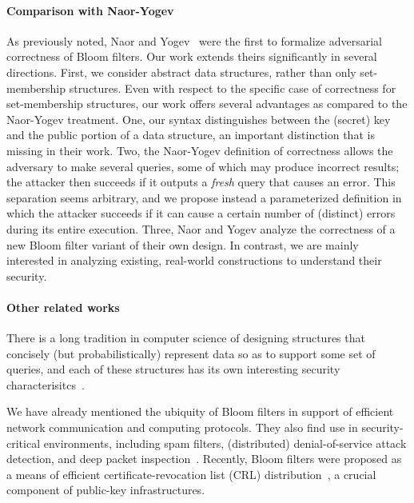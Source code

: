 \paragraph{Comparison with Naor-Yogev}
As previously noted, Naor and Yogev~\cite{naor2015bloom} were the first to
formalize adversarial correctness of Bloom filters.  Our work extends theirs
significantly in several directions. First, we consider abstract data
structures, rather than only set-membership structures.  Even with respect to
the specific case of correctness for set-membership structures, our work offers
several advantages as compared to the Naor-Yogev treatment.
%
One, our syntax distinguishes between the (secret) key and the public portion of
a data structure, an important distinction that is missing in their work.
%
Two, the Naor-Yogev definition of correctness allows the adversary to make
several queries, some of which may produce incorrect results; the attacker then
succeeds if it outputs a \emph{fresh} query that causes an error. This
separation seems arbitrary, and we propose instead a parameterized definition in
which the attacker succeeds if it can cause a certain number of (distinct)
errors during its entire execution.
%
Three, Naor and Yogev analyze the correctness of a new Bloom filter variant of
their own design. In contrast, we are mainly interested in analyzing existing,
real-world constructions to understand their security.

\paragraph{Other related works}
There is a long tradition in computer science of designing structures that
concisely (but probabilistically) represent data so as to support some set of
queries, and each of these structures has its own interesting security
characterisitcs~\cite{chazelle2004bloomier,cormode2005improved,DP08a,DF03,fredman1984storing,mironov2011sketching}.

We have already mentioned the ubiquity of Bloom filters in support of efficient
network communication and computing protocols.  They also find use in
security-critical environments, including spam filters, (distributed)
denial-of-service attack detection, and deep packet
inspection~\cite{tarkoma2012theory}.  Recently, Bloom filters were proposed as a
means of efficient certificate-revocation list (CRL)
distribution~\cite{larisch2017crlite}, a crucial component of public-key
infrastructures.

